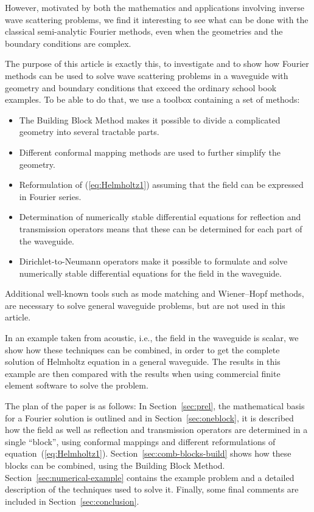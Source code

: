 \documentclass[numreferences]{kluwer}
\begin{document}
However, motivated by both the mathematics and applications involving
inverse wave scattering problems, we find it interesting to see what
can be done with the classical semi-analytic Fourier methods, even
when the geometries and the boundary conditions are complex.

The purpose of this article is exactly this, to investigate and to
show how Fourier methods can be used to solve wave scattering problems
in a waveguide with geometry and boundary conditions that exceed the
ordinary school book examples. To be able to do that, we use a toolbox
containing a set of methods:
\begin{itemize}
\item The Building Block Method makes it possible to divide a
  complicated geometry into several tractable parts.
\item Different conformal mapping methods are used to further simplify
  the geometry.
\item Reformulation of (\ref{eq:Helmholtz1}) assuming that the field
  can be expressed in Fourier series.
\item Determination of numerically stable differential equations for
  reflection and transmission operators means that these can be
  determined for each part of the waveguide.
\item Dirichlet-to-Neumann operators make it possible to formulate and
  solve numerically stable differential equations for the field in the
  waveguide.
\end{itemize}

Additional well-known tools such as mode matching and Wiener--Hopf
methods, are necessary to solve general waveguide problems, but are
not used in this article.

In an example taken from acoustic, i.e., the field in the waveguide
is scalar, we show how these techniques can be combined, in order to
get the complete solution of Helmholtz equation in a general
waveguide. The results in this example are then compared with the
results when using commercial finite element software to solve the
problem.

The plan of the paper is as follows: In Section~\ref{sec:prel}, the
mathematical basis for a Fourier solution is outlined and in
Section~\ref{sec:oneblock}, it is described how the field as well as
reflection and transmission operators are determined in a single
``block'', using conformal mappings and different reformulations of
equation~(\ref{eq:Helmholtz1}).  Section~\ref{sec:comb-blocks-build}
shows how these blocks can be combined, using the Building Block
Method. Section~\ref{sec:numerical-example} contains the example
problem and a detailed description of the techniques used to solve
it. Finally, some final comments are included in
Section~\ref{sec:conclusion}.
\end{document}
